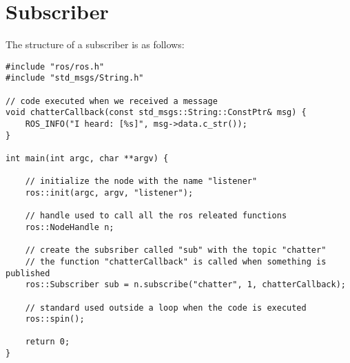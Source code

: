 \section{Subscriber}

The structure of a subscriber is as follows: 
\begin{verbatim}
#include "ros/ros.h"
#include "std_msgs/String.h"

// code executed when we received a message
void chatterCallback(const std_msgs::String::ConstPtr& msg) {
    ROS_INFO("I heard: [%s]", msg->data.c_str());
}

int main(int argc, char **argv) {

    // initialize the node with the name "listener"
    ros::init(argc, argv, "listener");

    // handle used to call all the ros releated functions
    ros::NodeHandle n;

    // create the subsriber called "sub" with the topic "chatter"
    // the function "chatterCallback" is called when something is published
    ros::Subscriber sub = n.subscribe("chatter", 1, chatterCallback);

    // standard used outside a loop when the code is executed
    ros::spin();

    return 0;
}
\end{verbatim}